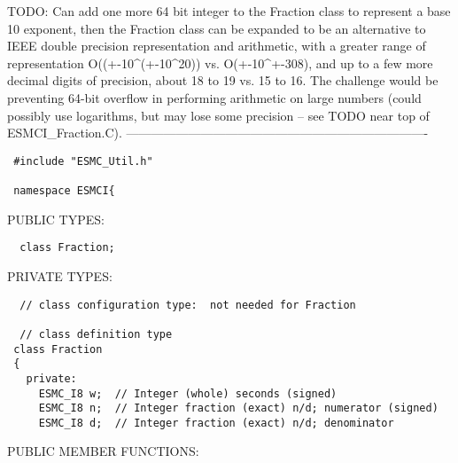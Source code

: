    TODO:  Can add one more 64 bit integer to the Fraction class to represent a
          base 10 exponent, then the Fraction class can be expanded to be an
          alternative to IEEE double precision representation and arithmetic,
          with a greater range of representation O((+-10^(+-10^20)) vs.
          O(+-10^+-308), and up to a few more decimal digits of precision,
          about 18 to 19 vs. 15 to 16.  The challenge would be preventing
          64-bit overflow in performing arithmetic on large numbers (could
          possibly use logarithms, but may lose some precision -- see TODO
          near top of ESMCI_Fraction.C).
  -------------------------------------------------------------------------
  
\begin{verbatim} #include "ESMC_Util.h"
 
 namespace ESMCI{
 \end{verbatim}{\sf PUBLIC TYPES:}
\begin{verbatim}  class Fraction;
 \end{verbatim}{\sf PRIVATE TYPES:}
\begin{verbatim}  // class configuration type:  not needed for Fraction
 
  // class definition type
 class Fraction
 {
   private:
     ESMC_I8 w;  // Integer (whole) seconds (signed)
     ESMC_I8 n;  // Integer fraction (exact) n/d; numerator (signed)
     ESMC_I8 d;  // Integer fraction (exact) n/d; denominator
 \end{verbatim}{\sf PUBLIC MEMBER FUNCTIONS:}
